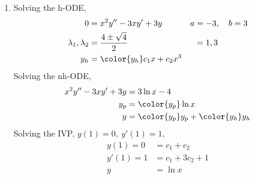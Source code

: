 \begin{enumerate}
    \item Solving the h-ODE,
          \begin{align}
              0                        & = x^{2}y'' - 3xy' + 3y            & a & = -3, \quad b = 3 \\
              \lambda_{1}, \lambda_{2} & = \frac{4 \pm \sqrt{4}}{2}        &   & = 1, 3            \\
              y_{h}                    & = \color{y_h} c_{1}x + c_{2}x^{3}
          \end{align}
          Solving the nh-ODE,
          \begin{align}
              x^{2}y'' - 3xy' + 3y & = 3\ln x - 4                                \\
              y_{p}                & = \color{y_p} \ln x                         \\
              y                    & = {\color{y_p} y_{p}} + {\color{y_h} y_{h}}
          \end{align}
          Solving the IVP, $ y(1) = 0,\ y'(1) = 1 $,
          \begin{align}
              y(1) = 0  & = c_{1} + c_{2}      \\
              y'(1) = 1 & = c_{1} + 3c_{2} + 1 \\
              y         & = \ln x
          \end{align}


\end{enumerate}
